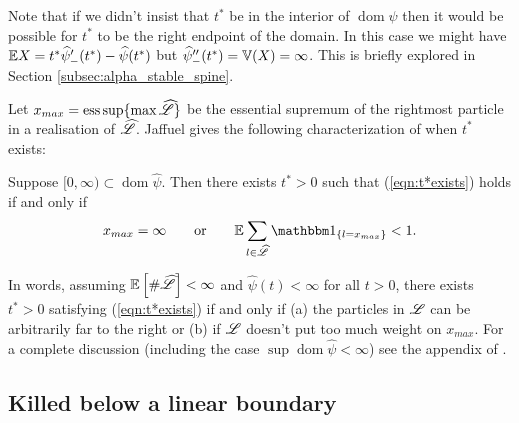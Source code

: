 \begin{remark}
Note that if we didn't insist that $t^*$ be in the interior of $\operatorname*{dom} \widehat{\psi}$ then it would be possible for $t^*$ to be the right endpoint of the domain. In this case we might have $\mathbb{E} X = t^* \widehat{\psi}'_-(t^*) - \widehat{\psi}(t^*)$ but $\widehat{\psi}''_-(t^*) = \mathbb{V}(X) = \infty$. This is briefly explored in Section \ref{subsec:alpha_stable_spine}. 
\end{remark}
Let $x_{max} = \operatorname*{ess\,sup} \{\max\widehat{\mathscr{L}}\}$ be the essential supremum of the rightmost particle in a realisation of $\widehat{\mathscr{L}}$. Jaffuel gives the following characterization of when $t^*$ exists:
\begin{proposition}\label{prop:jaffuel}
Suppose $[0, \infty) \subset \operatorname*{dom}\widehat{\psi}$. Then there exists $t^* > 0$ such that (\ref{eqn:t*exists}) holds if and only if 
\begin{equation}\nonumber
x_{max} = \infty \qquad \text{or} \qquad\E \sum_{l \in \widehat{\scr{L}}} \Ind_{\{ l = x_{max}\}} < 1. 
\end{equation}
\end{proposition}
In words, assuming $\mathbb{E}\left[ \#\widehat{\mathscr{L}} \right] < \infty$ and $\widehat{\psi}(t) < \infty$ for all $t>0$, there exists $t^* > 0$ satisfying (\ref{eqn:t*exists}) if and only if (a) the particles in $\mathscr{L}$ can be arbitrarily far to the right or (b) if $\mathscr{L}$ doesn't put too much weight on $x_{max}$. For a complete discussion (including the case $\sup \operatorname*{dom} \widehat{\psi} < \infty$) see the appendix of \cite{jaffuel2227critical}.






\subsection{Killed below a linear boundary}

